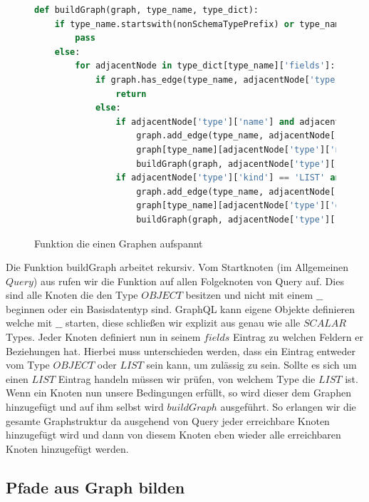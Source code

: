 \begin{figure}
    \begin{lstlisting}[language=Python]
def buildGraph(graph, type_name, type_dict):
    if type_name.startswith(nonSchemaTypePrefix) or type_name in baseDatatypes:
        pass
    else:
        for adjacentNode in type_dict[type_name]['fields']:
            if graph.has_edge(type_name, adjacentNode['type']['name']):
                return
            else:
                if adjacentNode['type']['name'] and adjacentNode['type']['name'] not in baseDatatypes:
                    graph.add_edge(type_name, adjacentNode['type']['name'])
                    graph[type_name][adjacentNode['type']['name']]["data"] = adjacentNode
                    buildGraph(graph, adjacentNode['type']['name'], type_dict)
                if adjacentNode['type']['kind'] == 'LIST' and adjacentNode['type']['ofType']['name'] not in baseDatatypes:
                    graph.add_edge(type_name, adjacentNode['type']['ofType']['name'])
                    graph[type_name][adjacentNode['type']['ofType']['name']]["data"] = adjacentNode
                    buildGraph(graph, adjacentNode['type']['ofType']['name'], type_dict)
    \end{lstlisting}
    \caption{Funktion die einen Graphen aufspannt}
    \label{graphbuild}
\end{figure}

Die Funktion buildGraph arbeitet rekursiv.
Vom Startknoten (im Allgemeinen $Query$) aus rufen wir die Funktion auf allen Folgeknoten von Query auf.
Dies sind alle Knoten die den Type $OBJECT$ besitzen und nicht mit einem $\_\_$ beginnen oder ein Basisdatentyp sind.
GraphQL kann eigene Objekte definieren welche mit $\_\_$ starten, diese schließen wir explizit aus genau wie alle $SCALAR$ Types.
Jeder Knoten definiert nun in seinem $fields$ Eintrag zu welchen Feldern er Beziehungen hat.
Hierbei muss unterschieden werden, dass ein Eintrag entweder vom Type $OBJECT$ oder $LIST$ sein kann, um zulässig zu sein.
Sollte es sich um einen $LIST$ Eintrag handeln müssen wir prüfen, von welchem Type die $LIST$ ist.
Wenn ein Knoten nun unsere Bedingungen erfüllt, so wird dieser dem Graphen hinzugefügt und auf ihm selbst wird $buildGraph$ ausgeführt.
So erlangen wir die gesamte Graphstruktur da ausgehend von Query jeder erreichbare Knoten hinzugefügt wird und dann von diesem Knoten eben wieder alle erreichbaren Knoten
hinzugefügt werden.
\newpage
\subsection{Pfade aus Graph bilden}

